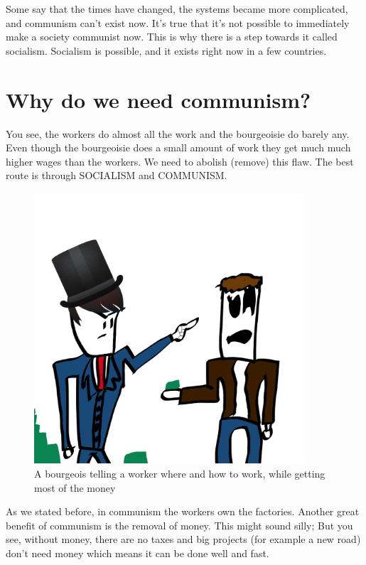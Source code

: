 \documentclass[a4paper]{book} %
\begin{document}
Some say that the times have changed, the systems became more complicated, and communism can't exist now. It's true that it's not possible to immediately make a society communist now. This is why there is a step towards it called socialism. Socialism is possible, and it exists right now in a few countries.

\chapter{Why do we need communism?}

You see, the workers do almost all the work and the bourgeoisie do barely any. Even though the bourgeoisie does a small amount of work they get much much higher wages than the workers. We need to abolish (remove) this flaw. The best route is through SOCIALISM and COMMUNISM.

\begin{figure}[tbhp]
\centering
\includegraphics[width=0.9\textwidth]{2-1.png}
\caption{A bourgeois telling a worker where and how to work, while getting most of the money}
\end{figure}
  
  As we stated before, in communism the workers own the factories. Another great benefit of communism is the removal of money. This might sound silly; But you see, without money, there are no taxes and big projects (for example a new road) don't need money which means it can be done well and fast.
\end{document}
